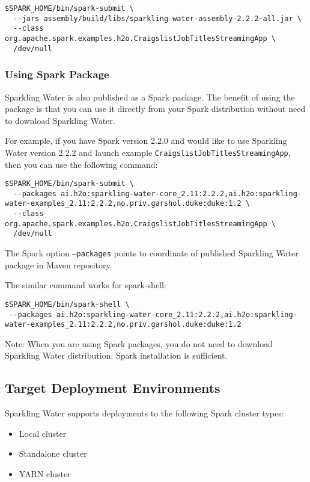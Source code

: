 \pagebreak
\begin{lstlisting}[style=Bash]
$SPARK_HOME/bin/spark-submit \
  --jars assembly/build/libs/sparkling-water-assembly-2.2.2-all.jar \
  --class org.apache.spark.examples.h2o.CraigslistJobTitlesStreamingApp \
  /dev/null
\end{lstlisting}

\subsubsection{Using Spark Package}

Sparkling Water is also published as a Spark package. The benefit of using the package is that you can use it directly from your Spark distribution without need to download Sparkling Water.

For example, if you have Spark version 2.2.0 and would like to use Sparkling Water version 2.2.2 and launch example \texttt{CraigslistJobTitlesStreamingApp}, then you can use the following command:

\begin{lstlisting}[style=Bash]
$SPARK_HOME/bin/spark-submit \
  --packages ai.h2o:sparkling-water-core_2.11:2.2.2,ai.h2o:sparkling-water-examples_2.11:2.2.2,no.priv.garshol.duke:duke:1.2 \
  --class org.apache.spark.examples.h2o.CraigslistJobTitlesStreamingApp \
  /dev/null
\end{lstlisting}

The Spark option \texttt{--packages} points to coordinate of published Sparkling Water package in Maven repository.

The similar command works for spark-shell:

\begin{lstlisting}[style=Bash]
$SPARK_HOME/bin/spark-shell \
 --packages ai.h2o:sparkling-water-core_2.11:2.2.2,ai.h2o:sparkling-water-examples_2.11:2.2.2,no.priv.garshol.duke:duke:1.2
\end{lstlisting}

Note: When you are using Spark packages, you do not need to download Sparkling Water distribution. Spark installation is sufficient.

\newpage
\subsection{Target Deployment Environments}
Sparkling Water supports deployments to the following Spark cluster types:
\begin{itemize}
	\item{Local cluster}
	\item{Standalone cluster} 
	\item{YARN cluster}
\end{itemize}


